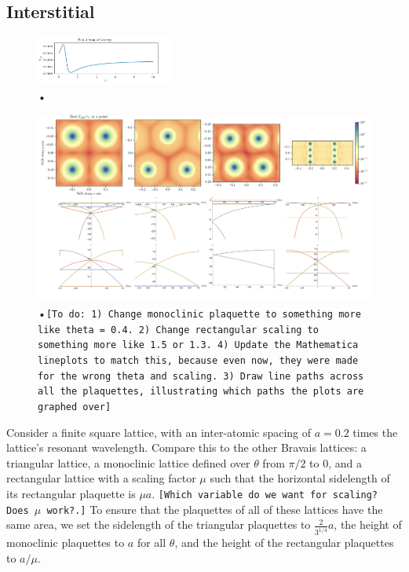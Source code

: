 \documentclass[aps,pra,superscriptaddress,twocolumn]{revtex4-1}
\newcommand{\commentSB}[1]{\texttt{\color{blue}[#1]}}
\begin{document}
\subsection{Interstitial}

\begin{figure}
    \centering
    \includegraphics[width=0.4\textwidth]{figures/temp_delta_check_cropped.png} 
    \caption{•}
    \label{fig:delta_check}
\end{figure}

\begin{figure}
    \centering
    \includegraphics[width=1.0\textwidth]{figures/interstitial_figure.png} 
    \caption{•\commentSB{To do: 1) Change monoclinic plaquette to something more like theta = 0.4.   2) Change rectangular scaling to something more like 1.5 or 1.3.  4) Update the Mathematica lineplots to match this, because even now, they were made for the wrong theta and scaling. 3) Draw line paths across all the plaquettes, illustrating which paths the plots are graphed over}}
    \label{fig:interstitial}
\end{figure}

Consider a finite square lattice, with an inter-atomic spacing of $a = 0.2$ times the lattice's resonant wavelength. Compare this to the other Bravais lattices: a triangular lattice, a monoclinic lattice defined over $\theta$ from $\pi/2$ to $0$, and a rectangular lattice with a scaling factor $\mu$ such that the horizontal sidelength of its rectangular plaquette is $\mu a$. 
\commentSB{Which variable do we want for scaling? Does $\mu$ work?.} To ensure that the plaquettes of all of these lattices have the same area, we set the sidelength of the triangular plaquettes to $\frac{2}{3^{1/4}}a$, the height of monoclinic plaquettes to $a$ for all $\theta$, and the height of the rectangular plaquettes to $a/\mu$. 
\end{document}
